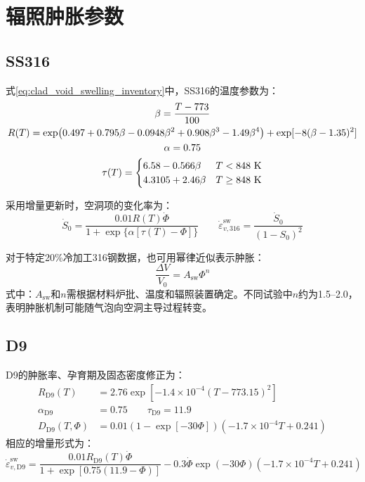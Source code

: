\section{辐照肿胀参数}
\label{app:cladding_swelling_parameters}

\subsection{SS316}

式\eqref{eq:clad_void_swelling_inventory}中，SS316的温度参数为\cite{halesBISONTheoryManual2016,hofmanMetallicFuelsHandbook2019}：
\begin{gather}
	\beta=\frac{T-773}{100}
	\notag
	\\
	R(T)=\exp\!\left(
	0.497+0.795\beta-0.0948\beta^2
	+0.908\beta^3-1.49\beta^4
	\right)
	+\exp[-8(\beta-1.35)^2]
	\notag
	\\
	\alpha=0.75
	\notag
	\\
	\tau(T)=
	\begin{cases}
		6.58-0.566\beta & T<848\ \mathrm{K}\\
		4.3105+2.46\beta & T\geq848\ \mathrm{K}
	\end{cases}
	\label{eq:appendix_ss316_swelling_parameters}
\end{gather}

采用增量更新时，空洞项的变化率为：
\begin{equation}
	\dot S_0
	=\frac{0.01R(T)\dot\varPhi}
	{1+\exp\{\alpha[\tau(T)-\varPhi]\}}
	\qquad
	\dot\varepsilon_{v,316}^{\mathrm{sw}}
	=\frac{\dot S_0}{(1-S_0)^2}
	\label{eq:appendix_ss316_swelling_rate}
\end{equation}

对于特定20\%冷加工316钢数据，也可用幂律近似表示肿胀：
\begin{equation}
	\frac{\Delta V}{V_0}=A_{\mathrm{sw}}\varPhi^n
	\label{eq:appendix_cw316_power_law_swelling}
\end{equation}
\noindent 式中：$A_{\mathrm{sw}}$和$n$需根据材料炉批、温度和辐照装置确定。不同试验中$n$约为1.5--2.0，表明肿胀机制可能随气泡向空洞主导过程转变。

\subsection{D9}

D9的肿胀率、孕育期及固态密度修正为：
\begin{equation}
	\label{eq:appendix_d9_swelling_parameters}
	\begin{aligned}
		R_{\mathrm{D9}}(T)
		&=2.76\exp[-1.4\times10^{-4}(T-773.15)^2]\\
		\alpha_{\mathrm{D9}}&=0.75
		\qquad
		\tau_{\mathrm{D9}}=11.9\\
		D_{\mathrm{D9}}(T,\varPhi)
		&=0.01(1-\exp[-30\varPhi])
		(-1.7\times10^{-4}T+0.241)
	\end{aligned}
\end{equation}
相应的增量形式为：
\begin{equation}
	\dot\varepsilon_{v,\mathrm{D9}}^{\mathrm{sw}}
	=\frac{0.01R_{\mathrm{D9}}(T)\dot\varPhi}
	{1+\exp[0.75(11.9-\varPhi)]}
	-0.3\dot\varPhi\exp(-30\varPhi)
	(-1.7\times10^{-4}T+0.241)
	\label{eq:appendix_d9_swelling_rate}
\end{equation}

